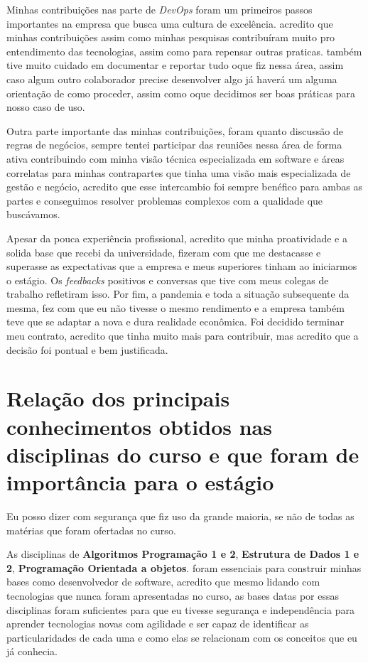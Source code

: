\documentclass{ufscar}
\begin{document}
Minhas contribuições nas parte de \textit{DevOps} foram um primeiros passos importantes na empresa que busca uma cultura de excelência. acredito que minhas contribuições assim como minhas pesquisas contribuíram muito pro entendimento das tecnologias, assim como para repensar outras praticas. também tive muito cuidado em documentar e reportar tudo oque fiz nessa área, assim caso algum outro colaborador precise desenvolver algo já haverá um alguma orientação de como proceder, assim como oque decidimos ser boas práticas para nosso caso de uso. 

Outra parte importante das minhas contribuições, foram quanto discussão de regras de negócios, sempre tentei participar das reuniões nessa área de forma ativa contribuindo com minha visão técnica especializada em software e áreas correlatas para minhas contrapartes que tinha uma visão mais especializada de gestão e negócio, acredito que esse intercambio foi sempre benéfico para ambas as partes e conseguimos resolver problemas complexos com a qualidade que buscávamos.

Apesar da pouca experiência profissional, acredito que minha proatividade e a solida base que recebi da universidade, fizeram com que me destacasse e superasse as expectativas que a empresa e meus superiores tinham ao iniciarmos o estágio. Os \textit{feedbacks} positivos e conversas que tive com meus colegas de trabalho refletiram isso. Por fim, a pandemia e toda a situação
subsequente da mesma, fez com que eu não tivesse o mesmo rendimento e a empresa também teve que se adaptar a nova e dura realidade econômica. Foi decidido terminar meu contrato, acredito que tinha muito mais para contribuir, mas acredito que a decisão foi pontual e bem justificada.

\section{Relação dos principais conhecimentos obtidos nas disciplinas do curso e que foram de importância para o estágio}

Eu posso dizer com segurança que fiz uso da grande maioria, se não de todas as matérias que foram ofertadas no curso.

As disciplinas de \textbf{Algoritmos Programação 1 e 2}, \textbf{Estrutura de Dados 1 e 2}, \textbf{Programação Orientada a objetos}. foram essenciais para construir minhas bases como desenvolvedor de software, acredito que mesmo lidando com tecnologias que nunca foram apresentadas no curso, as bases datas por essas disciplinas foram suficientes para que eu tivesse segurança e independência para aprender tecnologias novas com agilidade e ser capaz de identificar as particularidades de cada uma e como elas se relacionam com os conceitos que eu já conhecia. 
\end{document}

